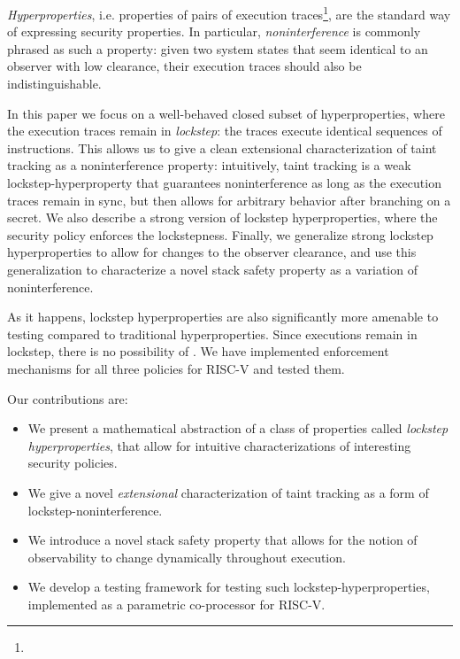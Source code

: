 \documentclass[conference]{IEEEtran}
\begin{document}
{\em Hyperproperties}, i.e. properties of pairs of
execution traces\footnote{ }, are the
standard way of expressing security
properties\cn. In particular, {\em noninterference} is commonly
phrased as such a property: given two system states that seem
identical to an observer with low clearance, their execution traces
should also be indistinguishable\cn.

In this paper we focus on a well-behaved closed subset of
hyperproperties, where the execution traces remain in {\em lockstep}:
the traces execute identical sequences of instructions.
%
This allows us to give a clean extensional characterization of taint
tracking as a noninterference property: intuitively, taint tracking is
a weak lockstep-hyperproperty that guarantees noninterference as long
as the execution traces remain in sync, but then allows for arbitrary
behavior after branching on a secret.
%
We also describe a strong version of lockstep hyperproperties, where
the security policy enforces the lockstepness. 
%
Finally, we generalize strong lockstep hyperproperties to allow for
  changes to the observer clearance, and use this
generalization to characterize a novel stack safety property as
a variation of noninterference.

As it happens, lockstep hyperproperties are also significantly more
amenable to testing compared to traditional hyperproperties. Since
executions remain in lockstep, there is no possibility of . We have implemented enforcement mechanisms
for all three policies for RISC-V and tested them.

Our contributions are:
\begin{itemize}
\item We present a mathematical abstraction of a class of properties
  called {\em lockstep hyperproperties}, that allow for intuitive
  characterizations of interesting security policies.
\item We give a novel {\em extensional} characterization of taint tracking
  as a form of lockstep-noninterference.
\item We introduce a novel stack safety property that allows for
  the notion of observability to change dynamically throughout
  execution.
\item We develop a testing framework for testing such
  lockstep-hyperproperties, implemented as a parametric co-processor
  for RISC-V.
\end{itemize}
\end{document}

